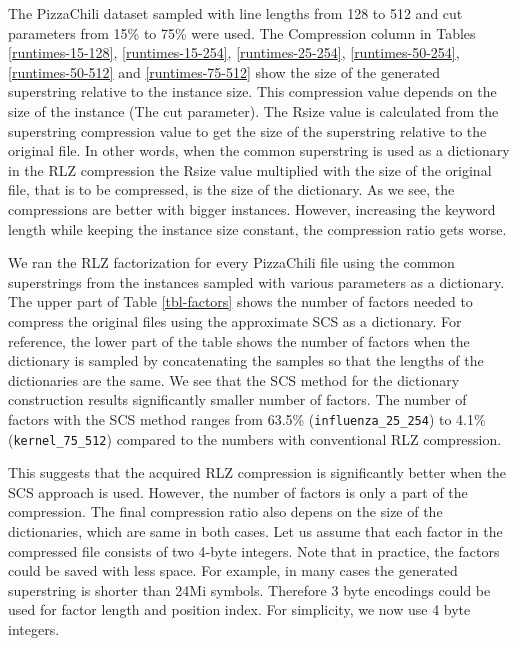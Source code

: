 \documentclass[english,twoside,censored,csm,algorithms-track-2020]{HYthesisML}
\theoremstyle{plain}
\theoremstyle{definition}
\begin{document}
The PizzaChili dataset sampled with line lengths from 128 to 512 and cut parameters from 15\% to
75\% were used. The Compression column in Tables \ref{runtimes-15-128}, \ref{runtimes-15-254},
\ref{runtimes-25-254}, \ref{runtimes-50-254}, \ref{runtimes-50-512} and \ref{runtimes-75-512} show the
size of the generated superstring relative to the instance size. This compression value depends
on the size of the instance (The cut parameter). The Rsize value is calculated from the superstring
compression value to get the size of the superstring relative to the original file. In other words,
when the common superstring is used as a dictionary in the RLZ compression the Rsize value multiplied
with the size of the original file, that is to be compressed, is the size of the dictionary. As we
see, the compressions are better with bigger instances. However, increasing the keyword length while
keeping the instance size constant, the compression ratio gets worse. 

We ran the RLZ factorization for every PizzaChili file using the common superstrings from the instances
sampled with various parameters as a dictionary. The upper part of Table \ref{tbl-factors} shows the
number of factors needed to compress the original files using the approximate SCS as a dictionary.
For reference, the lower part of the table shows the number of factors when the dictionary
is sampled by concatenating the samples so that the lengths of the dictionaries are the same. We see
that the SCS method for the dictionary construction results significantly smaller number of factors.
The number of factors with the SCS method ranges from 63.5\% (\texttt{influenza\_25\_254}) to
4.1\% (\texttt{kernel\_75\_512}) compared to the numbers with conventional RLZ compression.

This suggests that the acquired RLZ compression is significantly better when the SCS approach is
used. However, the number of factors is only a part of the compression. The final compression ratio
also depens on the size of the dictionaries, which are same in both cases. Let us assume that each
factor in the compressed file consists of two 4-byte integers. Note that in practice, the factors
could be saved with less space. For example, in many cases the generated superstring is shorter than
24Mi symbols. Therefore 3 byte encodings could be used for factor length and position index.
For simplicity, we now use 4 byte integers.
\end{document}
